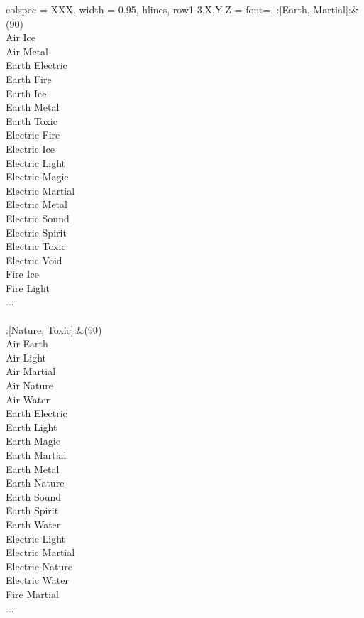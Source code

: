 \begin{longtblr}[
	caption = {2v2 Defending Weak},
	label = {2v2-Defending-Weak},
]{
	colspec = {XXX}, width = 0.95\linewidth,
	hlines,
	row{1-3,X,Y,Z} = {font=\bfseries},
}
	:[Earth, Martial]:&{(90)\\
	Air Ice \\
	Air Metal \\
	Earth Electric \\
	Earth Fire \\
	Earth Ice \\
	Earth Metal \\
	Earth Toxic \\
	Electric Fire \\
	Electric Ice \\
	Electric Light \\
	Electric Magic \\
	Electric Martial \\
	Electric Metal \\
	Electric Sound \\
	Electric Spirit \\
	Electric Toxic \\
	Electric Void \\
	Fire Ice \\
	Fire Light \\
	...\\
	}\\

	:[Nature, Toxic]:&{(90)\\
	Air Earth \\
	Air Light \\
	Air Martial \\
	Air Nature \\
	Air Water \\
	Earth Electric \\
	Earth Light \\
	Earth Magic \\
	Earth Martial \\
	Earth Metal \\
	Earth Nature \\
	Earth Sound \\
	Earth Spirit \\
	Earth Water \\
	Electric Light \\
	Electric Martial \\
	Electric Nature \\
	Electric Water \\
	Fire Martial \\
	...\\
	}\\


\end{longtblr}
